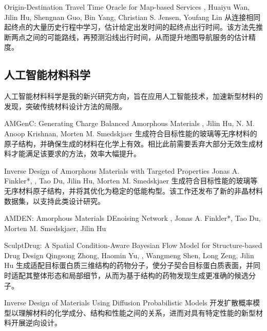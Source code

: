 {Origin-Destination Travel Time Oracle for Map-based Services}
{\me, Huaiyu Wan, Jilin Hu, Shengnan Guo, Bin Yang, Christian S. Jensen, Youfang Lin}
{从连接相同起终点的大量历史行程中学习，估计给定出发时间的起终点出行时间。该方法先推断两点之间的可能路线，再预测沿线出行时间，从而提升地图导航服务的估计精度。}

\subsection*{人工智能材料科学}
人工智能材料科学是我的新兴研究方向，旨在应用人工智能技术，加速新型材料的发现，突破传统材料设计方法的局限。

{AMGenC: Generating Charge Balanced Amorphous Materials}
{\me, Jilin Hu, N. M. Anoop Krishnan, Morten M. Smedskjaer}
{生成符合目标性能的玻璃等无序材料的原子结构，并确保生成的材料在化学上有效。相比此前需要丢弃大部分无效生成材料才能满足该要求的方法，效率大幅提升。}

{Inverse Design of Amorphous Materials with Targeted Properties}
{Jonas A. Finkler*, \me*, Tao Du, Jilin Hu, Morten M. Smedskjaer}
{生成符合目标性能的玻璃等无序材料原子结构，并将其优化为稳定的低能构型。该工作还发布了新的非晶材料数据集，以支持此类设计研究。}

{AMDEN: Amorphous Materials DEnoising Network}
{\me*, Jonas A. Finkler*, Tao Du, Morten M. Smedskjaer, Jilin Hu}{}

{SculptDrug: A Spatial Condition-Aware Bayesian Flow Model for Structure-based Drug Design}
{Qingsong Zhong, Haomin Yu, \me, Wangmeng Shen, Long Zeng, Jilin Hu}
{生成适配目标蛋白质三维结构的药物分子，使分子契合目标蛋白质表面，并同时适配其整体形态和局部细节，从而为基于结构的药物发现生成更准确的候选分子。}

{Inverse Design of Materials Using Diffusion Probabilistic Models}
{}
{开发扩散概率模型以理解材料的化学成分、结构和性能之间的关系，进而对具有特定性能的新型材料开展逆向设计。}
